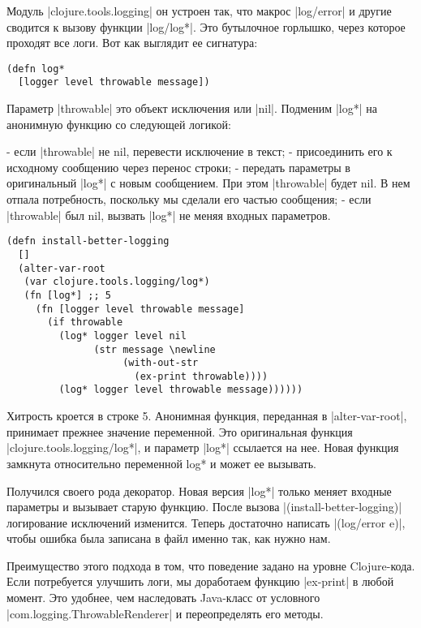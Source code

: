 Модуль \spverb|clojure.tools.logging| он устроен так, что макрос \spverb|log/error| и другие
сводится к вызову функции \spverb|log/log*|. Это бутылочное горлышко, через которое
проходят все логи. Вот как выглядит ее сигнатура:

\begin{verbatim}
(defn log*
  [logger level throwable message])
\end{verbatim}

Параметр \spverb|throwable| это объект исключения или \spverb|nil|. Подменим \spverb|log*| на
анонимную функцию со следующей логикой:

- если \spverb|throwable| не nil, перевести исключение в текст;
- присоединить его к исходному сообщению через перенос строки;
- передать параметры в оригинальный \spverb|log*| с новым сообщением. При этом
  \spverb|throwable| будет nil. В нем отпала потребность, поскольку мы сделали его
  частью сообщения;
- если \spverb|throwable| был nil, вызвать \spverb|log*| не меняя входных параметров.

\begin{verbatim}
(defn install-better-logging
  []
  (alter-var-root
   (var clojure.tools.logging/log*)
   (fn [log*] ;; 5
     (fn [logger level throwable message]
       (if throwable
         (log* logger level nil
               (str message \newline
                    (with-out-str
                      (ex-print throwable))))
         (log* logger level throwable message))))))
\end{verbatim}

Хитрость кроется в строке 5. Анонимная функция, переданная в \spverb|alter-var-root|,
принимает прежнее значение переменной. Это оригинальная функция
\spverb|clojure.tools.logging/log*|, и параметр \spverb|log*| ссылается на нее. Новая функция
замкнута относительно переменной log* и может ее вызывать.

Получился своего рода декоратор. Новая версия \spverb|log*| только меняет входные
параметры и вызывает старую функцию. После вызова \spverb|(install-better-logging)|
логирование исключений изменится. Теперь достаточно написать \spverb|(log/error e)|,
чтобы ошибка была записана в файл именно так, как нужно нам.

Преимущество этого подхода в том, что поведение задано на уровне
Clojure-кода. Если потребуется улучшить логи, мы доработаем функцию \spverb|ex-print| в
любой момент. Это удобнее, чем наследовать Java-класс от условного
\spverb|com.logging.ThrowableRenderer| и переопределять его методы.

